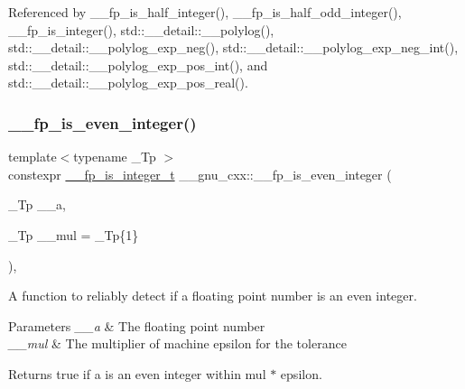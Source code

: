 Referenced by \+\_\+\+\_\+fp\+\_\+is\+\_\+half\+\_\+integer(), \+\_\+\+\_\+fp\+\_\+is\+\_\+half\+\_\+odd\+\_\+integer(), \+\_\+\+\_\+fp\+\_\+is\+\_\+integer(), std\+::\+\_\+\+\_\+detail\+::\+\_\+\+\_\+polylog(), std\+::\+\_\+\+\_\+detail\+::\+\_\+\+\_\+polylog\+\_\+exp\+\_\+neg(), std\+::\+\_\+\+\_\+detail\+::\+\_\+\+\_\+polylog\+\_\+exp\+\_\+neg\+\_\+int(), std\+::\+\_\+\+\_\+detail\+::\+\_\+\+\_\+polylog\+\_\+exp\+\_\+pos\+\_\+int(), and std\+::\+\_\+\+\_\+detail\+::\+\_\+\+\_\+polylog\+\_\+exp\+\_\+pos\+\_\+real().

\mbox{\label{namespace____gnu__cxx_ab12d5d801c39cd185e31bf2ed6ce94ff}} 
\subsubsection{\texorpdfstring{\+\_\+\+\_\+fp\+\_\+is\+\_\+even\+\_\+integer()}{\_\_fp\_is\_even\_integer()}}
{\footnotesize\ttfamily template$<$typename \+\_\+\+Tp $>$ \\
constexpr \hyperlink{struct____gnu__cxx_1_1____fp__is__integer__t}{\+\_\+\+\_\+fp\+\_\+is\+\_\+integer\+\_\+t} \+\_\+\+\_\+gnu\+\_\+cxx\+::\+\_\+\+\_\+fp\+\_\+is\+\_\+even\+\_\+integer (\begin{DoxyParamCaption}\item[{\+\_\+\+Tp}]{\+\_\+\+\_\+a,  }\item[{\+\_\+\+Tp}]{\+\_\+\+\_\+mul = {\ttfamily \+\_\+Tp\{1\}} }\end{DoxyParamCaption})\hspace{0.3cm}{\ttfamily [inline]}, {\ttfamily [noexcept]}}

A function to reliably detect if a floating point number is an even integer.


\begin{DoxyParams}{Parameters}
{\em \+\_\+\+\_\+a} & The floating point number \\
\hline
{\em \+\_\+\+\_\+mul} & The multiplier of machine epsilon for the tolerance \\
\hline
\end{DoxyParams}
\begin{DoxyReturn}{Returns}
{\ttfamily true} if a is an even integer within mul $\ast$ epsilon. 
\end{DoxyReturn}


